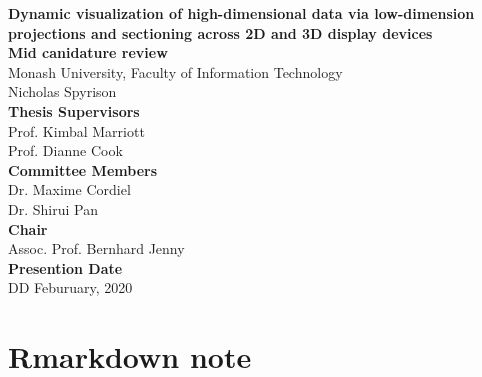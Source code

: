 \documentclass[11,]{article}
\title{}
\author{}
\date{}
\begin{document}

\onehalfspacing
{}

\begin{center}
\LARGE{\textbf{\LARGE{\textbf{Dynamic visualization of high-dimensional data via
low-dimension projections and sectioning across 2D and 3D display devices}}}}\\
\vspace*{2\baselineskip}
\Large{\textbf{Mid canidature review}}\\
\normalsize{Monash University, Faculty of Information Technology}\\
\vspace*{2\baselineskip}
\Large{Nicholas Spyrison}\\ %
\vspace*{3\baselineskip}
\Large{\textbf{Thesis Supervisors}}\\
Prof. Kimbal Marriott\\
Prof. Dianne Cook\\
\vspace*{2\baselineskip}
\Large{\textbf{Committee Members}}\\
Dr. Maxime Cordiel\\
Dr. Shirui Pan\\
\vspace*{1\baselineskip}
\Large{\textbf{Chair}}\\
Assoc. Prof. Bernhard Jenny\\
\vspace*{1\baselineskip}
\Large{\textbf{Presention Date}}\\
DD Feburuary, 2020
\end{center}

\doublespacing

\hypersetup{linkcolor = blue}
\newpage
{}
\tableofcontents
{}

\newpage

% 

\doublespacing

\newpage
{}
\hypersetup{linkcolor = blue}

{
\hypersetup{linkcolor=black}
\setcounter{tocdepth}{2}
\tableofcontents
}
\hypertarget{sec:intro}{%
\section{Rmarkdown note}\label{sec:intro}}
\end{document}
